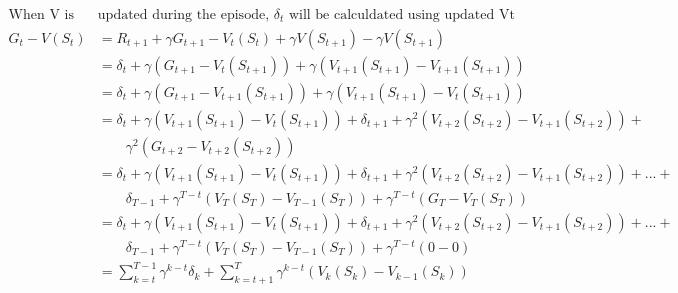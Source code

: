 \documentclass{article}
\begin{document}

\[
  \begin{aligned}
    \text{When V is }& \text{updated during the episode, }\delta_t \text{ will be calculdated using updated Vt}\\
    G_t - V (S_t) &= R_{t+1} + \gamma G_{t+1} - V_t(S_t) + \gamma V(S_{t+1}) - \gamma V(S_{t+1})\\
    &= \delta_t + \gamma (G_{t+1} - V_t(S_{t+1})) + \gamma (V_{t+1}(S_{t+1}) - V_{t+1}(S_{t+1}))\\
    &= \delta_t + \gamma (G_{t+1} - V_{t+1}(S_{t+1})) + \gamma (V_{t+1}(S_{t+1}) - V_t(S_{t+1}))\\
    &= \delta_t + \gamma (V_{t+1}(S_{t+1}) - V_t(S_{t+1})) + \delta_{t+1} + \gamma^{2} (V_{t+2}(S_{t+2}) - V_{t+1}(S_{t+2})) +\\ 
    &\quad\quad \gamma^{2}(G_{t+2} - V_{t+2}(S_{t+2}))\\
    &= \delta_t + \gamma (V_{t+1}(S_{t+1}) - V_t(S_{t+1})) + \delta_{t+1} + \gamma^{2} (V_{t+2}(S_{t+2}) - V_{t+1}(S_{t+2})) + ... + \\
    &\quad\quad \delta_{T-1} + \gamma^{T-t} (V_{T}(S_{T}) - V_{T-1}(S_{T})) + \gamma^{T-t}(G_{T} - V_{T}(S_{T}))\\
    &= \delta_t + \gamma (V_{t+1}(S_{t+1}) - V_t(S_{t+1})) + \delta_{t+1} + \gamma^{2} (V_{t+2}(S_{t+2}) - V_{t+1}(S_{t+2})) + ... + \\
    &\quad\quad \delta_{T-1} + \gamma^{T-t} (V_{T}(S_{T}) - V_{T-1}(S_{T})) + \gamma^{T-t}(0 - 0)\\
    &= \sum_{k=t}^{T-1} \gamma^{k-t} \delta_k + \sum_{k=t+1}^{T} \gamma^{k-t} (V_{k}(S_{k}) - V_{k-1}(S_{k}))\\
  \end{aligned}
\]
\end{document}
